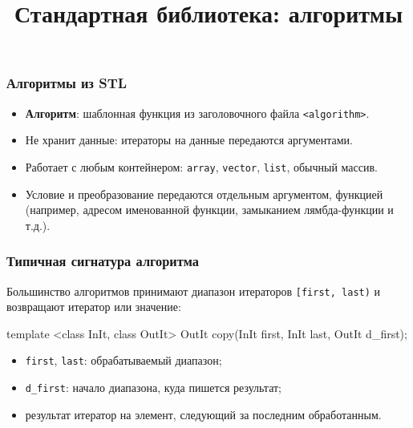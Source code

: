 \documentclass[compress, 8pt, aspectratio=169]{beamer}
\title{Стандартная библиотека: алгоритмы}
\begin{document}
  \frame[plain]{\titlepage}

  \begin{frame}[fragile]

    \frametitle{Алгоритмы из STL}

    \begin{itemize}

      \item \textbf{Алгоритм}: шаблонная функция
        из заголовочного файла \texttt{<algorithm>}.
      \item Не хранит данные: итераторы на данные
        передаются аргументами.
      \item Работает с любым контейнером:
        \texttt{array}, \texttt{vector}, \texttt{list}, обычный массив.
      \item Условие и преобразование передаются отдельным аргументом,
        функцией (например, адресом именованной функции, замыканием
        лямбда-функции и т.д.).

    \end{itemize}

  \end{frame}

  \begin{frame}[fragile]

    \frametitle{Типичная сигнатура алгоритма}

    Большинство алгоритмов принимают диапазон итераторов
    \texttt{[first, last)} и возвращают итератор или значение:

    \begin{myinplacelisting}[minted language=cpp]
template <class InIt, class OutIt>
OutIt copy(InIt first, InIt last, OutIt d_first);
    \end{myinplacelisting}

    \begin{itemize}

      \item \texttt{first}, \texttt{last}: обрабатываемый диапазон;
      \item \texttt{d\_first}: начало диапазона, куда пишется результат;
      \item результат \textemdash \space итератор на элемент, следующий за
        последним обработанным.

    \end{itemize}

  \end{frame}
\end{document}

